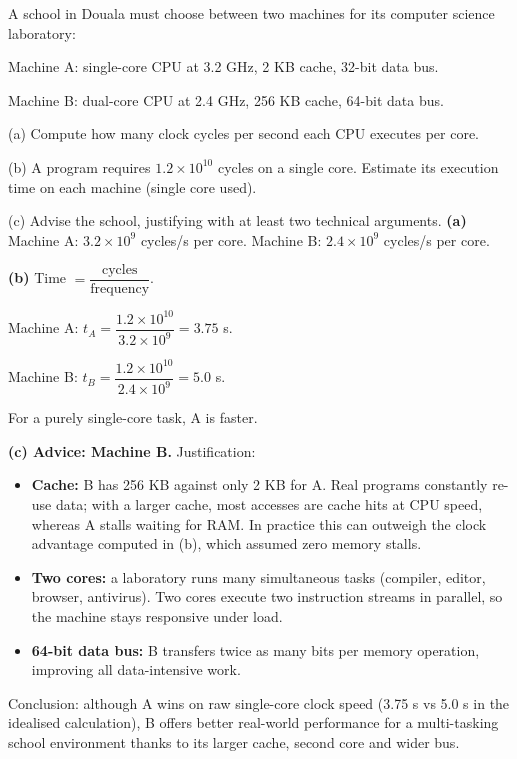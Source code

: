 \documentclass[11pt]{article}
\begin{document}
\begin{exoresolu}
A school in Douala must choose between two machines for its computer science laboratory:\par
Machine A: single-core CPU at 3.2 GHz, 2 KB cache, 32-bit data bus.\par
Machine B: dual-core CPU at 2.4 GHz, 256 KB cache, 64-bit data bus.\par
(a) Compute how many clock cycles per second each CPU executes per core.\par
(b) A program requires $1.2 \times 10^{10}$ cycles on a single core. Estimate its execution time on each machine (single core used).\par
(c) Advise the school, justifying with at least two technical arguments.
\tcblower
\textbf{(a)} Machine A: $3.2 \times 10^{9}$ cycles/s per core. Machine B: $2.4 \times 10^{9}$ cycles/s per core.\par
\textbf{(b)} Time $= \dfrac{\text{cycles}}{\text{frequency}}$.\par
Machine A: $t_A = \dfrac{1.2 \times 10^{10}}{3.2 \times 10^{9}} = 3.75$ s.\par
Machine B: $t_B = \dfrac{1.2 \times 10^{10}}{2.4 \times 10^{9}} = 5.0$ s.\par
For a purely single-core task, A is faster.\par
\textbf{(c) Advice: Machine B.} Justification:
\begin{itemize}
\item \textbf{Cache:} B has 256 KB against only 2 KB for A. Real programs constantly re-use data; with a larger cache, most accesses are cache hits at CPU speed, whereas A stalls waiting for RAM. In practice this can outweigh the clock advantage computed in (b), which assumed zero memory stalls.
\item \textbf{Two cores:} a laboratory runs many simultaneous tasks (compiler, editor, browser, antivirus). Two cores execute two instruction streams in parallel, so the machine stays responsive under load.
\item \textbf{64-bit data bus:} B transfers twice as many bits per memory operation, improving all data-intensive work.
\end{itemize}
Conclusion: although A wins on raw single-core clock speed (3.75 s vs 5.0 s in the idealised calculation), B offers better real-world performance for a multi-tasking school environment thanks to its larger cache, second core and wider bus.
\end{exoresolu}
\end{document}
